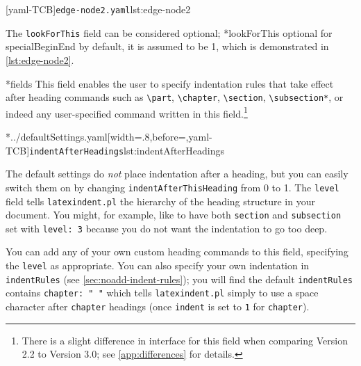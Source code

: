 	\begin{cmhtcbraster}[ raster left skip=-3.5cm,]
		[yaml-TCB]{\texttt{edge-node2.yaml}}{lst:edge-node2}
	\end{cmhtcbraster}

	The \texttt{lookForThis} field can be considered
	optional;%
	*{lookForThis optional for specialBeginEnd} by default, it is assumed to be 1, which is demonstrated in
	\cref{lst:edge-node2}.

*{fields}
	This field enables the user to specify indentation rules that take effect after heading
	commands such as \lstinline!\part!, \lstinline!\chapter!,
	\lstinline!\section!, \lstinline!\subsection*!, or indeed any user-specified command
	written in this field.\footnote{There is a slight difference in interface for this field
		when comparing Version 2.2 to Version 3.0; see \vref{app:differences} for details.}

	\cmhlistingsfromfile[style=indentAfterHeadings]*{../defaultSettings.yaml}[width=.8\linewidth,before=\centering,yaml-TCB]{\texttt{indentAfterHeadings}}{lst:indentAfterHeadings}

	The default settings do \emph{not} place indentation after a heading, but you can easily
	switch them on by changing \texttt{indentAfterThisHeading} from 0 to 1. The
	\texttt{level} field tells \texttt{latexindent.pl} the hierarchy of the heading structure
	in your document. You might, for example, like to have both \texttt{section} and
	\texttt{subsection} set with \texttt{level: 3} because you do not want the indentation to
	go too deep.

	You can add any of your own custom heading commands to this field, specifying the
	\texttt{level} as appropriate. You can also specify your own indentation in
	\texttt{indentRules} (see \vref{sec:noadd-indent-rules}); you will find the default
	\texttt{indentRules} contains
	\lstinline!chapter: " "! which tells \texttt{latexindent.pl} simply to use a space
	character after \texttt{chapter} headings (once \texttt{indent} is set to \texttt{1} for
	\texttt{chapter}).

